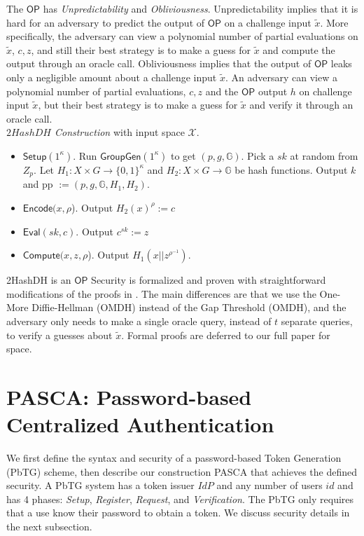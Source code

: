 \documentclass[conference]{IEEEtran}
\newcommand{\secparameter}{\kappa}
\newcommand{\uid}{id}
\begin{document}
The $\mathsf{OP}$ has {\em Unpredictability} and {\em Obliviousness}. Unpredictability implies that it is hard for an adversary to predict the output of $\mathsf{OP}$ on a challenge input $\tilde{x}$. More specifically, the adversary can view a polynomial number of partial evaluations on $\tilde{x}$, $c,z$, and still their best strategy is to make a guess for $\tilde{x}$ and compute the output through an oracle call. Obliviousness implies that the output of $\mathsf{OP}$ leaks only a negligible amount about a challenge input $\tilde{x}$. An adversary can view a polynomial number of partial evaluations, $c,z$ and the $\mathsf{OP}$ output $h$ on challenge input $\tilde{x}$, but their best strategy is to make a guess for $\tilde{x}$ and verify it through an oracle call.
\\
{\em $2HashDH$ Construction}  with input space $\mathcal{X}$.
\begin{itemize}
\item $\mathsf{Setup}(1^{\secparameter})$. Run $\mathsf{GroupGen}(1^{\secparameter})$ to get $(p,g,\mathbb{G})$. Pick a $sk$ at random from $Z_{p}$. Let $H_1: X \times G \rightarrow \{0,1\}^{\secparameter}$ and $H_2: X \times G \rightarrow \mathbb{G}$ be hash functions. Output $k$ and pp $:= (p,g,\mathbb{G},H_1,H_2)$.
\item $\mathsf{Encode}(x,\rho$). Output $H_2(x)^{\rho} := c$
\item $\mathsf{Eval}(sk,c)$. Output $c^{sk} := z$
\item $\mathsf{Compute}(x,z,\rho$).  Output $H_1(x||z^{\rho^{-1}})$.
\end{itemize}
%
  2HashDH is an $\mathsf{OP}$ Security is formalized and proven with straightforward modifications of the proofs in \cite{PASTA-Agrawal}. The main differences are that we use the One-More Diffie-Hellman (OMDH) instead of the Gap Threshold (OMDH), and the adversary only needs to make a single oracle query, instead of $t$ separate queries, to verify a guesses about $\tilde{x}$. Formal proofs are deferred to our full paper for space.

\section{PASCA: Password-based Centralized Authentication}
\label{sec:PbTG}

We first define the syntax and security of a password-based Token Generation (PbTG) scheme, then describe our construction PASCA that achieves the defined security. A PbTG system has a token issuer $IdP$ and any number of users $\uid$ and has 4 phases: {\em Setup}, {\em Register}, {\em Request}, and {\em Verification}. The PbTG only requires that a use know their password to obtain a token. We discuss security details in the next subsection. 
 
\end{document}
